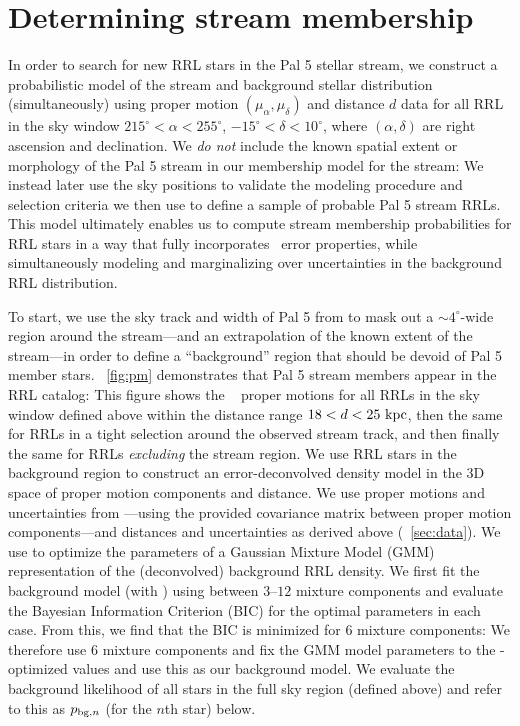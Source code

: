 \documentclass[twocolumn]{aastex63}
\begin{document}
\section{Determining stream membership} \label{sec:membership}

In order to search for new RRL stars in the Pal 5 stellar stream, we construct a probabilistic model of the stream and background stellar distribution (simultaneously) using proper motion $(\mu_\alpha, \mu_\delta)$ and distance $d$ data for all RRL in the sky window $215^\circ < \alpha < 255^\circ$, $-15^\circ < \delta < 10^\circ$, where $(\alpha, \delta)$ are right ascension and declination.
We \emph{do not} include the known spatial extent or morphology of the Pal 5 stream in our membership model for the stream: We instead later use the sky positions to validate the modeling procedure and selection criteria we then use to define a sample of probable Pal 5 stream RRLs.
This model ultimately enables us to compute stream membership probabilities for RRL stars in a way that fully incorporates \Gaia\ error properties, while simultaneously modeling and marginalizing over uncertainties in the background RRL distribution.

To start, we use the sky track and width of Pal 5 from \citet{Bonaca:2019} to mask out a $\sim4^\circ$-wide region around the stream---and an extrapolation of the known extent of the stream---in order to define a ``background'' region that should be devoid of Pal 5 member stars.
\figurename~\ref{fig:pm} demonstrates that Pal 5 stream members appear in the RRL catalog: This figure shows the \Gaia\  proper motions for all RRLs in the sky window defined above within the distance range $18 < d < 25~\mathrm{kpc}$, then the same for RRLs in a tight selection around the observed stream track, and then finally the same for RRLs \emph{excluding} the stream region.
We use RRL stars in the background region to construct an error-deconvolved density model in the 3D space of proper motion components and distance.
We use proper motions and uncertainties from \Gaia---using the provided covariance matrix between proper motion components---and distances and uncertainties as derived above (\sectionname~\ref{sec:data}).
We use  \citep[;][]{Bovy:XD} to optimize the parameters of a Gaussian Mixture Model (GMM) representation of the (deconvolved) background RRL density.
We first fit the background model (with ) using between $3$--$12$ mixture components and evaluate the Bayesian Information Criterion (BIC) for the optimal parameters in each case.
From this, we find that the BIC is minimized for 6 mixture components: We therefore use 6 mixture components and fix the GMM model parameters to the -optimized values and use this as our background model.
We evaluate the background likelihood of all stars in the full sky region (defined above) and refer to this as $p_{{\rm bg}, n}$ (for the $n$th star) below.
\end{document}
